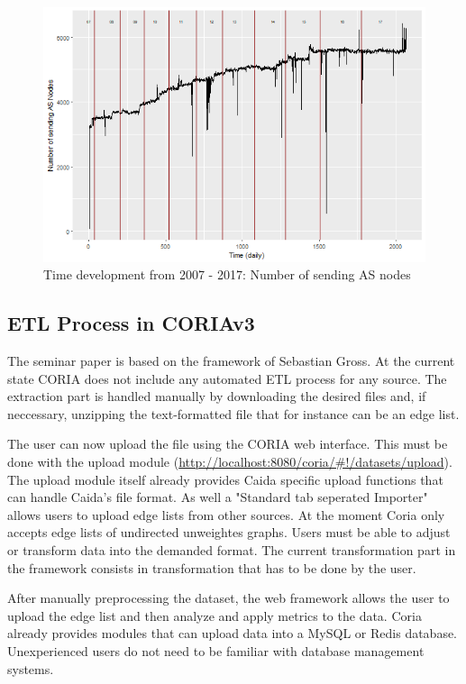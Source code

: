\documentclass[conference, 11pt]{IEEEtran}
\begin{document}
\begin{figure}[htbp]
\centerline{\includegraphics[scale=0.4]{Graphics/ASFromAll.png}}
\caption{Time development from 2007 - 2017: Number of sending AS nodes}
\label{fig}
\end{figure}


\subsection{ETL Process in CORIAv3}
The seminar paper is based on the framework of Sebastian Gross\cite{carl3}. At the current state CORIA does not include any automated ETL process for any source. The extraction part is handled manually by downloading the desired files and, if neccessary, unzipping the text-formatted file that for instance can be an edge list. \linebreak


The user can now upload the file using the CORIA web interface. This must be done with the upload module (\url{http://localhost:8080/coria/#!/datasets/upload}).
The upload module itself already provides Caida specific upload functions that can handle Caida's file format\cite{carl3}. As well a "Standard tab seperated Importer" allows users to upload edge lists from other sources. At the moment Coria only accepts edge lists of undirected unweightes graphs.
Users must be able to adjust or transform data into the demanded format. The current transformation part in the framework consists in transformation that has to be done by the user.\linebreak


After manually preprocessing the dataset, the web framework allows the user to upload the edge list and then analyze and apply metrics to the data.
Coria already provides modules that can upload data into a MySQL or Redis database. Unexperienced users do not need to be familiar with database management systems.
\end{document}
